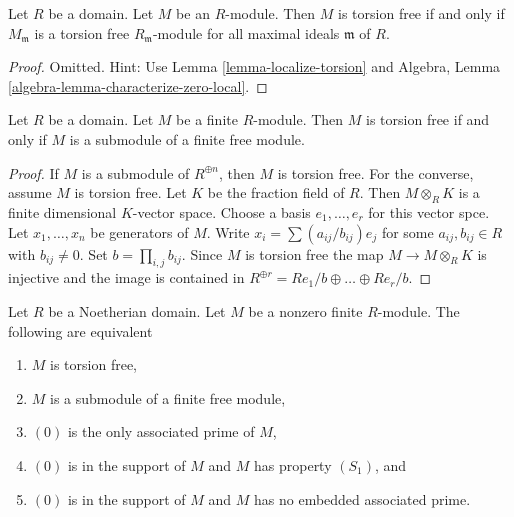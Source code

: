 \begin{lemma}
\label{lemma-check-torsion}
Let $R$ be a domain. Let $M$ be an $R$-module.
Then $M$ is torsion free if and only if $M_\mathfrak m$ is a
torsion free $R_\mathfrak m$-module for all maximal ideals
$\mathfrak m$ of $R$.
\end{lemma}

\begin{proof}
Omitted. Hint: Use Lemma \ref{lemma-localize-torsion} and
Algebra, Lemma \ref{algebra-lemma-characterize-zero-local}.
\end{proof}

\begin{lemma}
\label{lemma-finite-torsion-free-submodule-free}
Let $R$ be a domain. Let $M$ be a finite $R$-module.
Then $M$ is torsion free if and only if $M$ is a
submodule of a finite free module.
\end{lemma}

\begin{proof}
If $M$ is a submodule of $R^{\oplus n}$, then $M$ is torsion free.
For the converse, assume $M$ is torsion free. Let $K$ be the
fraction field of $R$. Then $M \otimes_R K$ is a finite dimensional
$K$-vector space. Choose a basis $e_1, \ldots, e_r$ for this vector
spce. Let $x_1, \ldots, x_n$ be generators of $M$. Write
$x_i = \sum (a_{ij}/b_{ij}) e_j$ for some $a_{ij}, b_{ij} \in R$
with $b_{ij} \not = 0$. Set $b = \prod_{i, j} b_{ij}$.
Since $M$ is torsion free the map
$M \to M \otimes_R K$ is injective and the image is contained
in $R^{\oplus r} = R e_1/b \oplus \ldots \oplus Re_r/b$.
\end{proof}

\begin{lemma}
\label{lemma-torsion-free-finite-noetherian-domain}
Let $R$ be a Noetherian domain. Let $M$ be a nonzero finite $R$-module.
The following are equivalent
\begin{enumerate}
\item $M$ is torsion free,
\item $M$ is a submodule of a finite free module,
\item $(0)$ is the only associated prime of $M$,
\item $(0)$ is in the support of $M$ and $M$ has property $(S_1)$, and
\item $(0)$ is in the support of $M$ and $M$ has no embedded associated prime.
\end{enumerate}
\end{lemma}

